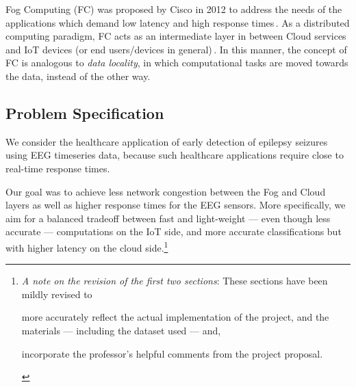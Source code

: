 \documentclass[letterpaper]{article}
\begin{document}
Fog Computing (FC) was proposed by Cisco in 2012 to address the needs of the applications which demand low latency and high response times\,\cite{cisco2012}. As a distributed computing paradigm, FC acts as an intermediate layer in between Cloud services and IoT devices (or end users/devices in general)\,\cite{Mahmud2018}. In this manner, the concept of FC is analogous to \emph{data locality}, in which computational tasks are moved towards the data, instead of the other way.




\subsection{Problem Specification}
We consider the healthcare application of early detection of epilepsy seizures using EEG timeseries data, because such healthcare applications require close to real-time response times.

Our goal was to achieve less network congestion between the Fog and Cloud layers as well as higher response times for the EEG sensors. More specifically, we aim for a balanced tradeoff between fast and light-weight --- even though less accurate --- computations on the IoT side, and more accurate classifications but with higher latency on the cloud side.\footnote{\emph{A note on the revision of the first two sections}: These sections have been mildly revised to \begin{enumerate*}[label=\arabic*)]
    \item more accurately reflect the actual implementation of the project, and the materials --- including the dataset used --- and,
    \item incorporate the professor's helpful comments from the project proposal.
  \end{enumerate*}}
\end{document}
